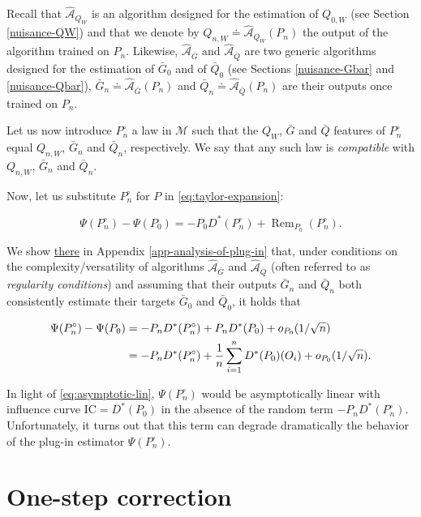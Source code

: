 \documentclass[11pt,openright,twoside]{book}
\DeclareMathOperator{\Rem}{Rem}
\newcommand{\Algo}{\widehat{\mathcal{A}}}
\newcommand{\defq}{\doteq}
\newcommand{\calM}{\mathcal{M}}
\newcommand{\IC}{\textrm{IC}}
\newcommand{\Gbar}{\bar{G}}
\newcommand{\Phat}{P^{\circ}}
\newcommand{\Qbar}{\bar{Q}}
\theoremstyle{definition}
\theoremstyle{definition}
\theoremstyle{definition}
\theoremstyle{remark}
\begin{document}
Recall that \(\Algo_{Q_{W}}\) is an algorithm designed for the estimation of
\(Q_{0,W}\) (see Section \ref{nuisance-QW}) and that we denote by \(Q_{n,W} \defq \Algo_{Q_{W}}(P_{n})\) the output of the algorithm trained on \(P_{n}\).
Likewise, \(\Algo_{\Gbar}\) and \(\Algo_{\Qbar}\) are two generic algorithms
designed for the estimation of \(\Gbar_{0}\) and of \(\Qbar_{0}\) (see Sections
\ref{nuisance-Gbar} and \ref{nuisance-Qbar}), \(\Gbar_{n} \defq \Algo_{\Gbar}(P_{n})\) and \(\Qbar_{n} \defq \Algo_{\Qbar}(P_{n})\) are their
outputs once trained on \(P_{n}\).

Let us now introduce \(\Phat_n\) a law in \(\calM\) such that the \(Q_{W}\), \(\Gbar\)
and \(\Qbar\) features of \(\Phat_n\) equal \(Q_{n,W}\), \(\Gbar_{n}\) and
\(\Qbar_{n}\), respectively. We say that any such law is \emph{compatible} with
\(Q_{n,W}\), \(\Gbar_n\) and \(\Qbar_n\).

Now, let us substitute \(\Phat_n\) for \(P\) in \eqref{eq:taylor-expansion}:

\begin{equation} 
\label{eq:hard-to-study}  \Psi(\Phat_n)  -  \Psi(P_0)   =  -  P_0  D^*(\Phat_n)  +
\Rem_{P_0}(\Phat_n) . 
\end{equation}

We show \protect\hyperlink{app-analysis-of-plug-in}{there} in Appendix
\ref{app-analysis-of-plug-in} that, under conditions on the
complexity/versatility of algorithms \(\Algo_{\Gbar}\) and \(\Algo_{\Qbar}\)
(often referred to as \emph{regularity conditions}) and assuming that their outputs
\(\Gbar_{n}\) and \(\Qbar_{n}\) both consistently estimate their targets
\(\Gbar_{0}\) and \(\Qbar_{0}\), it holds that

\begin{align} 
\Psi(\Phat_n) - \Psi(P_0) &= - P_{n} D^*(\Phat_n) +
 P_{n} D^*(P_0) + 
o_{P_0}(1/\sqrt{n}) \label{eq:pre-one-step} \\ 
\notag &= - P_{n} D^*(\Phat_n)+ \frac{1}{n} \sum_{i=1}^n D^*(P_0)(O_i)  + o_{P_0}(1/\sqrt{n}). 
\end{align}

In light of \eqref{eq:asymptotic-lin}, \(\Psi(\Phat_{n})\) would be
asymptotically linear with influence curve \(\IC=D^{*}(P_{0})\) in the absence of
the random term \(-P_{n} D^*(\Phat_n)\). Unfortunately, it turns out that this
term can degrade dramatically the behavior of the plug-in estimator
\(\Psi(\Phat_{n})\).

\hypertarget{huber-one-step}{%
\section{One-step correction}\label{huber-one-step}}
\end{document}
